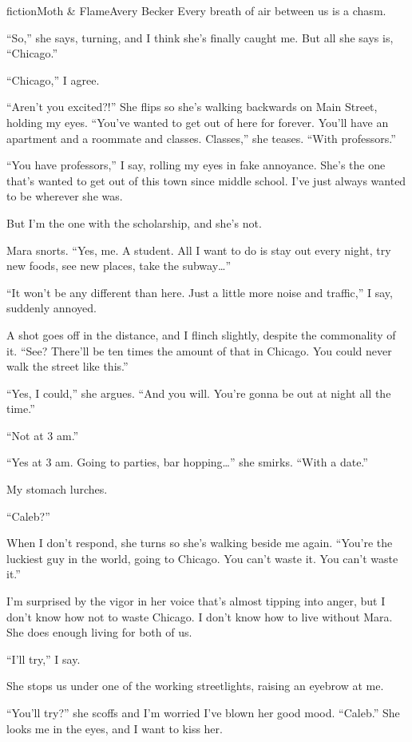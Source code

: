 \begin{prose}{fiction}{Moth \& Flame}{Avery Becker}
Every breath of air between us is a chasm.\par
“So,” she says, turning, and I think she's finally caught me. But all she says is, “Chicago.”\par
“Chicago,” I agree.\par
“Aren't you excited?!” She flips so she's walking backwards on Main Street, holding my eyes. “You've wanted to get out of here for forever. You'll have an apartment and a roommate and classes. Classes,” she teases. “With professors.” \par
“You have professors,” I say, rolling my eyes in fake annoyance. She's the one that's wanted to get out of this town since middle school. I've just always wanted to be wherever she was. \par
But I'm the one with the scholarship, and she's not.\par
Mara snorts. “Yes, me. A student. All I want to do is stay out every night, try new foods, see new places, take the subway…”\par
“It won't be any different than here. Just a little more noise and traffic,” I say, suddenly annoyed.\par
A shot goes off in the distance, and I flinch slightly, despite the commonality of it. “See? There'll be ten times the amount of that in Chicago. You could never walk the street like this.”\par
“Yes, I could,” she argues. “And you will. You're gonna be out at night all the time.” \par
“Not at 3 am.” \par
“Yes at 3 am. Going to parties, bar hopping…” she smirks. “With a date.” \par
My stomach lurches. \par
“Caleb?”\par
When I don't respond, she turns so she's walking beside me again. “You're the luckiest guy in the world, going to Chicago. You can't waste it. You can't waste it.”\par
I'm surprised by the vigor in her voice that's almost tipping into anger, but I don't know how not to waste Chicago. I don't know how to live without Mara. She does enough living for both of us.\par
“I'll try,” I say.\par
She stops us under one of the working streetlights, raising an eyebrow at me. \par
“You'll try?” she scoffs and I'm worried I've blown her good mood. “Caleb.” She looks me in the eyes, and I want to kiss her. \par

\end{prose}
